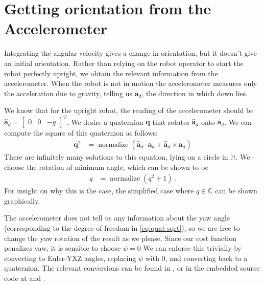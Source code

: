 \documentclass[main.tex]{subfiles}
\begin{document}
\section{Getting orientation from the Accelerometer}


	Integrating the angular velocity gives a change in orientation, but it doesn't give an initial orientation.
	Rather than relying on the robot operator to start the robot perfectly upright, we obtain the relevant information from the accelerometer. When the robot is not in motion the accelerometer measures only the acceleration due to gravity, telling us $\bm{a}_d$, the direction in which down lies.

	We know that for the upright robot, the reading of the accelerometer should be $\hat{\bm{a}}_d = \begin{bmatrix}0 & 0 & -g\end{bmatrix}^T$\footnotemark. We desire a quaternion $\bm{q}$ that rotates $\hat{\bm{a}}_d$ onto $\bm{a}_d$. We can compute the square of this quaternion as follows:
	\begin{align}
		\bm{q}^2
			&= \operatorname{normalize}\left(
				\hat{\bm{a}}_d \cdot \bm{a}_d + \hat{\bm{a}}_d \times \bm{a}_d
			\right)
			\label{eq:quat-sqrt}
	\end{align}
	There are infinitely many solutions to this equation, lying on a circle in $\mathbb{H}$.
	We choose the rotation of minimum angle, which can be shown to be
	\begin{align}
		q &= \operatorname{normalize}(q^2 + 1)\,.
	\end{align}
	For insight on why this is the case, the simplified case where $q\in\mathbb{C}$ can be shown graphically.

	The accelerometer does not tell us any information about the yaw angle (corresponding to the degree of freedom in \cref{eq:quat-sqrt}), so we are free to change the yaw rotation of the result as we please.
	Since our cost function penalizes yaw, it is sensible to choose $\psi = 0$
	We can enforce this trivially by converting to Euler-YXZ angles, replacing $\psi$ with $0$, and converting back to a quaternion\footnotemark. The relevant conversions can be found in \cite[eq~362 and 369]{diebel2006representing}, or in the embedded source code at  and .


\bib
\end{document}
